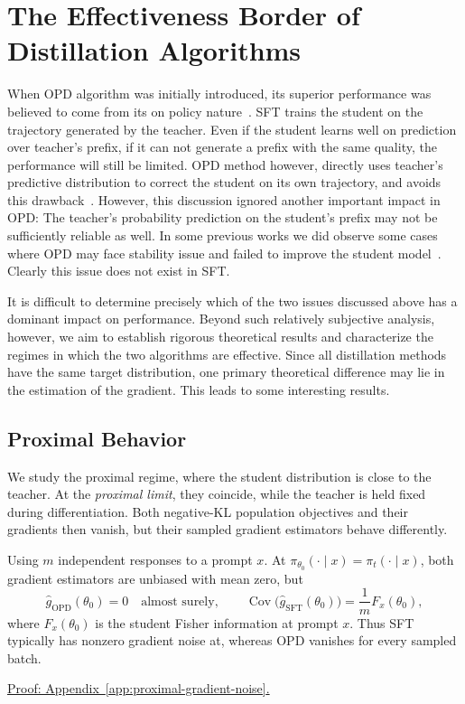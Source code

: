 \section{The Effectiveness Border of Distillation Algorithms}

When OPD algorithm was initially introduced, its superior performance was believed to come from its on policy nature~\citep{thinking_machines_lab_-policy_2025}. SFT trains the student on the trajectory generated by the teacher. Even if the student learns well on prediction over teacher's prefix, if it can not generate a prefix with the same quality, the performance will still be limited. OPD method however, directly uses teacher's predictive distribution to correct the student on its own trajectory, and avoids this drawback~\citep{thinking_machines_lab_-policy_2025}. However, this discussion ignored another important impact in OPD: The teacher's probability prediction on the student's prefix may not be sufficiently reliable as well. In some previous works we did observe some cases where OPD may face stability issue and failed to improve the student model~\citep{li_rethinking_2026}. Clearly this issue does not exist in SFT.

It is difficult to determine precisely which of the two issues discussed above has a dominant impact on performance. Beyond such relatively subjective analysis, however, we aim to establish rigorous theoretical results and characterize the regimes in which the two algorithms are effective. Since all distillation methods have the same target distribution, one primary theoretical difference may lie in the estimation of the gradient. This leads to some interesting results.

\subsection{Proximal Behavior}

We study the proximal regime, where the student distribution is close to the teacher. At the \emph{proximal limit}, they coincide, while the teacher is held fixed during differentiation. Both negative-KL population objectives and their gradients then vanish, but their sampled gradient estimators behave differently.

\begin{lemma}
\label{lem:proximal-gradient-noise}
Using $m$ independent responses to a prompt $x$. At
$\pi_{\theta_0}(\cdot\mid x)=\pi_t(\cdot\mid x)$, both gradient estimators are unbiased with mean zero, but
\begin{equation}
 \widehat g_{\mathrm{OPD}}(\theta_0)=0\quad\text{almost surely},
 \qquad
  \operatorname{Cov}\bigl(\widehat g_{\mathrm{SFT}}(\theta_0)\bigr)
 =\frac1m F_x(\theta_0),
 \label{eq:proximal-gradient-noise}
\end{equation}
where $F_x(\theta_0)$ is the student Fisher information at prompt $x$.
Thus SFT typically has nonzero gradient noise at, whereas OPD vanishes for every sampled batch.
\end{lemma}
\noindent\hyperref[app:proximal-gradient-noise]{Proof: Appendix~\ref*{app:proximal-gradient-noise}.}

